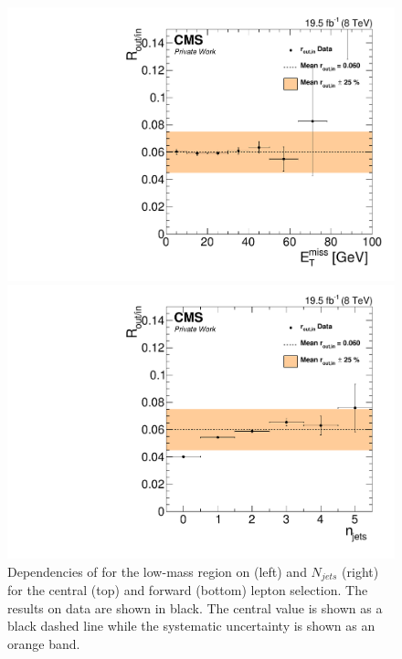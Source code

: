 \begin{figure}[htbp]
\begin{minipage}[t]{0.49\textwidth}
  \includegraphics[width=\textwidth]{plots/BG/rOutIn/rOutInSyst_DrellYanControlForward_Full2012_MET_LowMass_SF_None.pdf}
\end{minipage}
\begin{minipage}[t]{0.49\textwidth}
\includegraphics[width=\textwidth]{plots/BG/rOutIn/rOutInSyst_DrellYanControlForward_Full2012_NJets_LowMass_SF_None.pdf}
\end{minipage}
\caption{Dependencies of \Routin for the low-mass region on \MET (left) and $N_{jets}$ (right) for the central (top) and forward (bottom) lepton selection. The results on data are shown in black. The central value is shown as a black dashed line while the systematic uncertainty is shown as an orange band.}
\label{fig:ROutInDependencies}
\end{figure} 


